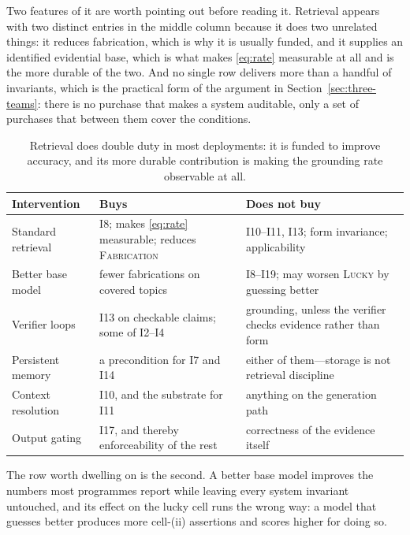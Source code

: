 \documentclass[11pt]{article}
\theoremstyle{plain}
\theoremstyle{definition}
\begin{document}
Two features of it are worth pointing out before reading it. Retrieval appears with two
distinct entries in the middle column because it does two unrelated things: it reduces
fabrication, which is why it is usually funded, and it supplies an identified evidential
base, which is what makes \eqref{eq:rate} measurable at all and is the more durable of
the two. And no single row delivers more than a handful of invariants, which is the
practical form of the argument in Section~\ref{sec:three-teams}: there is no purchase
that makes a system auditable, only a set of purchases that between them cover the
conditions.

\begin{table}[ht]
  \centering
  \small
  \begin{tabular}{@{}>{\raggedright\arraybackslash}p{3.3cm}>{\raggedright\arraybackslash}p{4.6cm}>{\raggedright\arraybackslash}p{5.4cm}@{}}
    \toprule
    Intervention & Buys & Does not buy \\
    \midrule
    Standard retrieval
      & I8; makes \eqref{eq:rate} measurable; reduces \textsc{Fabrication}
      & I10--I11, I13; form invariance; applicability \\
    \addlinespace
    Better base model
      & fewer fabrications on covered topics
      & I8--I19; may worsen \textsc{Lucky} by guessing better \\
    \addlinespace
    Verifier loops
      & I13 on checkable claims; some of I2--I4
      & grounding, unless the verifier checks evidence rather than form \\
    \addlinespace
    Persistent memory
      & a precondition for I7 and I14
      & either of them---storage is not retrieval discipline \\
    \addlinespace
    Context resolution
      & I10, and the substrate for I11
      & anything on the generation path \\
    \addlinespace
    Output gating
      & I17, and thereby enforceability of the rest
      & correctness of the evidence itself \\
    \bottomrule
  \end{tabular}
  \caption{Retrieval does double duty in most deployments: it is funded to improve
    accuracy, and its more durable contribution is making the grounding rate
    observable at all.}
  \label{tab:interventions}
\end{table}

The row worth dwelling on is the second. A better base model improves the numbers
most programmes report while leaving every system invariant untouched, and its
effect on the lucky cell runs the wrong way: a model that guesses better produces
more cell-(ii) assertions and scores higher for doing so.
\end{document}
